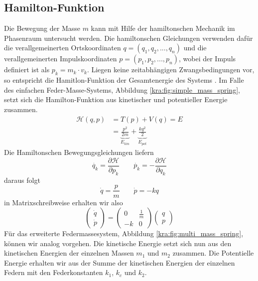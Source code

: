 \subsection{Hamilton-Funktion}
Die Bewegung der Masse $m$ kann mit Hilfe der hamiltonschen Mechanik im Phasenraum untersucht werden.
Die hamiltonschen Gleichungen verwenden dafür die verallgemeinerten Ortskoordinaten
$q = (q_{1}, q_{2}, ..., q_{n})$ und die verallgemeinerten Impulskoordinaten $p = (p_{1}, p_{2}, ..., p_{n})$, wobei der Impuls definiert ist als $p_k = m_k \cdot v_k$.
Liegen keine zeitabhängigen Zwangsbedingungen vor, so entspricht die Hamitlon-Funktion der Gesamtenergie des Systems \cite{kra:hamilton}.
Im Falle des einfachen Feder-Masse-Systems, Abbildung \ref{kra:fig:simple_mass_spring}, setzt sich die Hamilton-Funktion aus kinetischer und potentieller Energie zusammen.
\begin{equation}
    \label{kra:harmonischer_oszillator}
    \begin{split}
        \mathcal{H}(q, p) &= T(p) + V(q) = E \\
        &= \underbrace{\frac{p^2}{2m}}_{E_{kin}} + \underbrace{\frac{k q^2}{2}}_{E_{pot}}
    \end{split}
\end{equation}
Die Hamiltonschen Bewegungsgleichungen liefern \cite{kra:kanonischegleichungen}
\begin{equation}
    \label{kra:hamilton:bewegungsgleichung}
    \dot{q_{k}} = \frac{\partial \mathcal{H}}{\partial p_k}
    \qquad
    \dot{p_{k}} = -\frac{\partial \mathcal{H}}{\partial q_k}
\end{equation}
daraus folgt
\[
    \dot{q} = \frac{p}{m}
    \qquad
    \dot{p} = -kq
\]
in Matrixschreibweise erhalten wir also
\[
    \begin{pmatrix}
        \dot{q} \\
        \dot{p}
    \end{pmatrix}
    =
    \begin{pmatrix}
        0  & \frac{1}{m} \\
        -k & 0
    \end{pmatrix}
    \begin{pmatrix}
        q \\
        p
    \end{pmatrix}
\]
Für das erweiterte Federmassesystem, Abbildung \ref{kra:fig:multi_mass_spring}, können wir analog vorgehen.
Die kinetische Energie setzt sich nun aus den kinetischen Energien der einzelnen Massen $m_1$ und $m_2$ zusammen.
Die Potentielle Energie erhalten wir aus der Summe der kinetischen Energien der einzelnen Federn mit den Federkonstanten $k_1$, $k_c$ und $k_2$.
